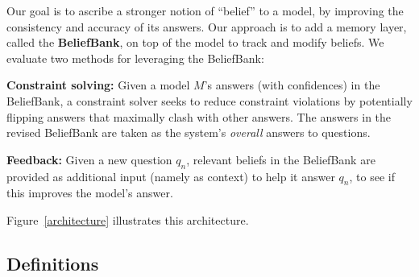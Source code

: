 \documentclass[11pt]{article}
\newenvironment{des}{                 %
     \parskip 0cm \begin{list}{}{\parsep 0cm \itemsep 0cm \topsep 0cm}}{
       \end{list}} %
\begin{document}
Our goal is to ascribe a stronger notion of ``belief'' to a model,
by improving the consistency and accuracy of its answers. Our approach is to add a
memory layer, called the {\bf BeliefBank}, on top of the model to track and modify
beliefs. We evaluate two methods for leveraging the BeliefBank:
\begin{des}
\item[{\bf Constraint solving:}] Given a model $M$'s answers (with confidences) in the BeliefBank, a constraint
solver seeks to reduce constraint violations by potentially flipping answers that maximally clash
with other answers. The answers in the revised BeliefBank are taken as the system's {\it overall} answers
to questions.
\item[{\bf Feedback:}] Given a new question $q_{n}$, relevant beliefs in the BeliefBank are
provided as additional input (namely as context) to help it answer $q_{n}$,
to see if this improves the model's answer.
\end{des}
Figure~\ref{architecture} illustrates this architecture.

\subsection{Definitions \label{definitions}}
\end{document}
